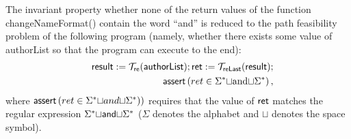The invariant property whether none of the return values of the function {\sf changeNameFormat()} contain the word ``and'' is reduced to the path feasibility problem of the following program (namely, whether there exists some value of {\sf authorList} so that the program can execute to the end):  
%
\begin{eqnarray}\label{eqn:exmp}
& & \sf result  := \sf  \mathcal{T}_{ re}(authorList); ret : = \mathcal{T}_{reLast}(result);\nonumber \\
& &  \textsf{assert}\left(ret \in \Sigma^*{\small\sqcup} \mbox{and}{\small\sqcup} \Sigma^*\right),
\end{eqnarray}
%
where $\textsf{assert}\left(ret \in \Sigma^*{\small\sqcup}and{\small\sqcup}\Sigma^*)\right)$ requires that the value of $\sf ret$ matches the regular expression $\Sigma^* {\small\sqcup}{\sf and}{\small\sqcup} \Sigma^*$ ($\Sigma$ denotes the alphabet and $\sqcup$ denotes the space symbol).

